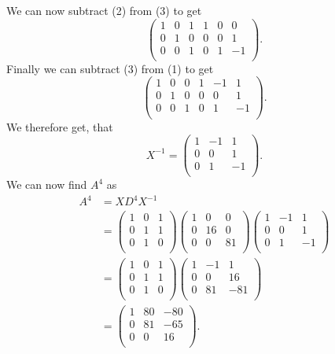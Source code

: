 We can now subtract (2) from (3) to get
\[ 
\left( \begin{array}{ccc|ccc}
1 & 0 & 1 & 1 & 0 & 0\\
0 & 1 & 0 & 0 & 0 & 1\\
0 & 0 & 1 & 0 & 1 & -1\\
\end{array} \right)
.\]
Finally we can subtract (3) from (1) to get
\[ 
\left( \begin{array}{ccc|ccc}
1 & 0 & 0 & 1 & -1 & 1\\
0 & 1 & 0 & 0 & 0 & 1\\
0 & 0 & 1 & 0 & 1 & -1\\
\end{array} \right)
.\]
We therefore get, that
\[ 
X^{-1} = \begin{pmatrix}
1 & -1 & 1\\
0 & 0 & 1\\
0 & 1 & -1\\
\end{pmatrix}
.\]
We can now find $A^{4}$ as
\begin{align*}
  A^{4} &= X D^{4} X^{-1} \\
  &= \begin{pmatrix}
  1 & 0 & 1\\
  0 & 1 & 1\\
  0 & 1 & 0\\
  \end{pmatrix}\begin{pmatrix}
  1 & 0 & 0\\
  0 & 16 & 0\\
  0 & 0 & 81\\
  \end{pmatrix} \begin{pmatrix}
  1 & -1 & 1\\
  0 & 0 & 1\\
  0 & 1 & -1\\
  \end{pmatrix}\\
  &= \begin{pmatrix}
  1 & 0 & 1\\
  0 & 1 & 1\\
  0 & 1 & 0\\
  \end{pmatrix} \begin{pmatrix}
  1 & -1 & 1\\
  0 & 0 & 16\\
  0 & 81 & -81\\
  \end{pmatrix} \\
  &= \begin{pmatrix}
  1 & 80 & -80\\
  0 & 81 & -65\\
  0 & 0 & 16\\
  \end{pmatrix}
.\end{align*}



